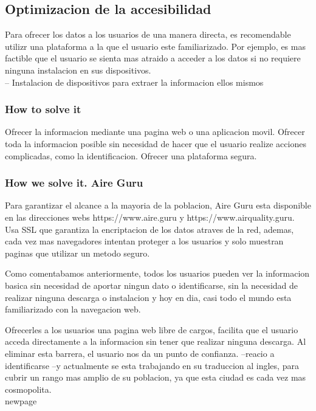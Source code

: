 \subsection{Optimizacion de la accesibilidad}

Para ofrecer los datos a los usuarios de una manera directa, es recomendable utilizr una plataforma a la que el usuario
este familiarizado. Por ejemplo, es mas factible que el usuario se sienta mas atraido a acceder a los datos si no requiere
ninguna instalacion en sus dispositivos.\\

-- Instalacion de dispositivos para extraer la informacion ellos mismos


\subsubsection{How to solve it} 
Ofrecer la informacion mediante una pagina web o una aplicacion movil. Ofrecer toda la informacion posible sin necesidad de
hacer que el usuario realize acciones complicadas, como la identificacion.
Ofrecer una plataforma segura.

\subsubsection{How we solve it. Aire Guru} 

Para garantizar el alcance a la mayoria de la poblacion, Aire Guru esta disponible en las direcciones webs https://www.aire.guru y https://www.airquality.guru.
Usa SSL que garantiza la encriptacion de los datos atraves de la red, ademas, cada vez mas navegadores intentan proteger a los usuarios y
solo muestran paginas que utilizar un metodo seguro. 

Como comentabamos anteriormente, todos los usuarios pueden ver la informacion basica sin necesidad de aportar ningun dato o identificarse, sin la necesidad de 
realizar ninguna descarga o instalacion y hoy en dia, casi todo el mundo esta familiarizado con la navegacion web.


Ofrecerles a los usuarios una pagina web libre de cargos, facilita que el usuario acceda directamente a la informacion
sin tener que realizar ninguna descarga. Al eliminar esta barrera, el usuario nos da un punto de confianza.
--reacio a identificarse
--y actualmente se esta trabajando en su traduccion al ingles, para cubrir un rango mas amplio de su poblacion, ya que esta ciudad es cada vez mas cosmopolita.
\\newpage